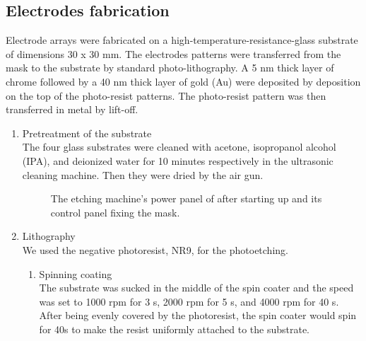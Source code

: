 \documentclass[journal,svgnames,twocolumn,x11names]{IEEEtran}
\begin{document}
\subsection{Electrodes fabrication}
Electrode arrays were fabricated on a high-temperature-resistance-glass substrate of dimensions 30 x 30 mm. The electrodes patterns were transferred from the mask to the substrate by standard photo-lithography. A 5 nm thick layer of chrome followed by a 40 nm thick layer of gold (Au) were deposited by deposition on the top of the photo-resist patterns. The photo-resist pattern was then transferred in metal by lift-off.
\begin{enumerate}
    \item Pretreatment of the substrate\\
    The four glass substrates were cleaned with acetone,  isopropanol alcohol (IPA), and deionized water for 10 minutes respectively in the ultrasonic cleaning machine. Then they were dried by the air gun.
    \begin{figure}[H]
    	\centering
    	\hspace{0.4in}
    	\caption{The etching machine's power panel of after starting up and its control panel fixing the mask.}
    	\label{fig:etching_machine}
    \end{figure}
    \item Lithography\\
    We used the negative photoresist, NR9, for the photoetching.
        \begin{enumerate}
            \item Spinning coating\\
                The substrate was sucked in the middle of the spin coater and the speed was set to 1000 rpm for 3 s, 2000 rpm for 5 s, and 4000 rpm for 40 s. After being evenly covered by the photoresist, the spin coater would spin for 40s to make the resist uniformly attached to the substrate.

\end{enumerate}
\end{enumerate}
\end{document}
